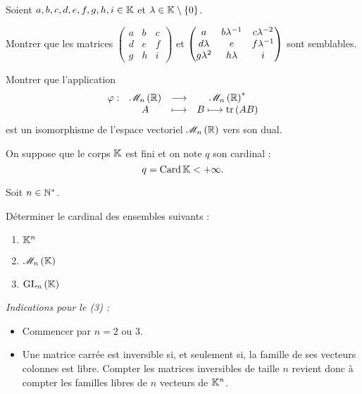 \begin{corr}
\end{corr}

\begin{exo}
Soient \(a,b,c,d,e,f,g,h,i\in\mathbb{K}\) et \(\lambda\in\mathbb{K}\setminus\left\lbrace0\right\rbrace\).

Montrer que les matrices \(\begin{pmatrix}
a & b & c \\
d & e & f \\
g & h & i
\end{pmatrix}\) et \(\begin{pmatrix}
a & b\lambda^{-1} & c\lambda^{-2} \\
d\lambda & e & f\lambda^{-1} \\
g\lambda^2 & h\lambda & i
\end{pmatrix}\) sont semblables.
\end{exo}

\begin{corr}
\end{corr}

\begin{exo}
Montrer que l'application \[\fonction{\phi}{\M{n}[\R]}{\M{n}[\R]\etoile}{A}{B\mapsto\tr\paren{AB}}\] est un isomorphisme de l'espace vectoriel \(\M{n}[\R]\) vers son dual.
\end{exo}

\begin{corr}
\end{corr}

\begin{exo}
On suppose que le corps \(\mathbb{K}\) est fini et on note \(q\) son cardinal : \[q=\operatorname{Card}\mathbb{K}<+\infty.\]

Soit \(n\in\mathbb{N}^*\).

Déterminer le cardinal des ensembles suivants :

\begin{enumerate}
\item \(\mathbb{K}^n\) \\

\item \(\M{n}\) \\

\item \(\GL{n}\)
\end{enumerate}

\textit{Indications pour le (3) :}

\begin{itemize}
\item Commencer par \(n=2\) ou \(3\). \\

\item Une matrice carrée est inversible si, et seulement si, la famille de ses vecteurs colonnes est libre. Compter les matrices inversibles de taille \(n\) revient donc à compter les familles libres de \(n\) vecteurs de \(\mathbb{K}^n\).
\end{itemize}
\end{exo}


